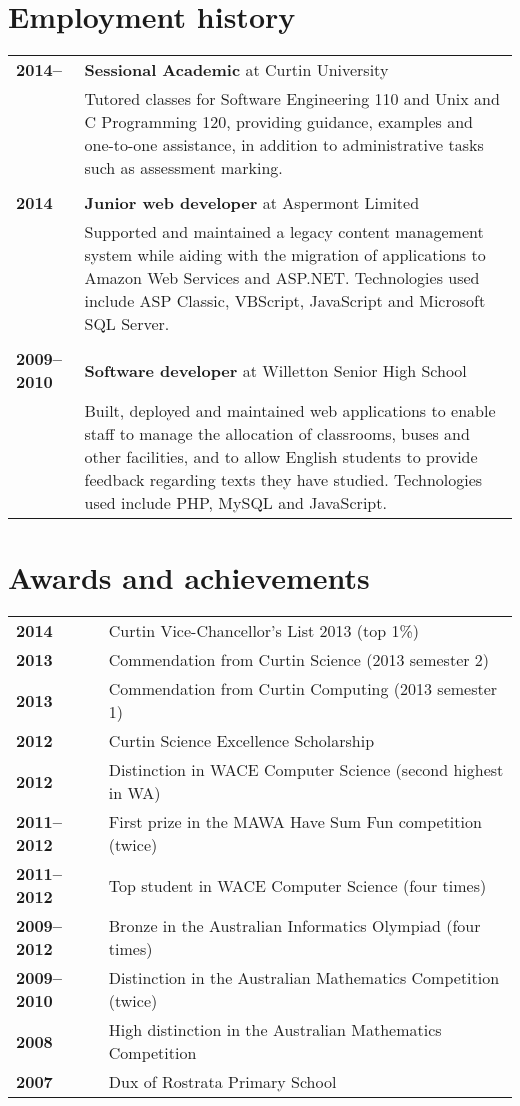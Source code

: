 \documentclass[a4paper,12pt]{article}
\begin{document}
\section*{Employment history}

\begin{tabular}{p{3.5cm}p{12.5cm}}
	\textbf{2014--} &
		\textbf{Sessional Academic} at Curtin University\\ &
		Tutored classes for Software Engineering 110 and Unix and C
		Programming 120, providing guidance, examples and one-to-one
		assistance, in addition to administrative tasks such as
		assessment marking.\\\\
	\textbf{2014} &
		\textbf{Junior web developer} at Aspermont Limited\\ &
		Supported and maintained a legacy content management system
		while aiding with the migration of applications to Amazon Web
		Services and ASP.NET. Technologies used include ASP Classic,
		VBScript, JavaScript and Microsoft SQL Server.\\\\
	\textbf{2009--2010} &
		\textbf{Software developer} at Willetton Senior High School\\ &
		Built, deployed and maintained web applications to enable staff
		to manage the allocation of classrooms, buses and other
		facilities, and to allow English students to provide feedback
		regarding texts they have studied. Technologies used include
		PHP, MySQL and JavaScript.\\
\end{tabular}

\section*{Awards and achievements}

\begin{tabular}{p{3.5cm}p{12.5cm}}
	\textbf{2014} &
		Curtin Vice-Chancellor's List 2013 (top 1\%)\\
	\textbf{2013} &
		Commendation from Curtin Science (2013 semester 2)\\
	\textbf{2013} &
		Commendation from Curtin Computing (2013 semester 1)\\
	\textbf{2012} &
		Curtin Science Excellence Scholarship\\
	\textbf{2012} &
		Distinction in WACE Computer Science (second highest in WA)\\
	\textbf{2011--2012} &
		First prize in the MAWA Have Sum Fun competition (twice)\\
	\textbf{2011--2012} &
		Top student in WACE Computer Science (four times)\\
	\textbf{2009--2012} &
		Bronze in the Australian Informatics Olympiad (four times)\\
	\textbf{2009--2010} &
		Distinction in the Australian Mathematics Competition (twice)\\
	\textbf{2008} &
		High distinction in the Australian Mathematics Competition\\
	\textbf{2007} &
		Dux of Rostrata Primary School
\end{tabular}
\end{document}
